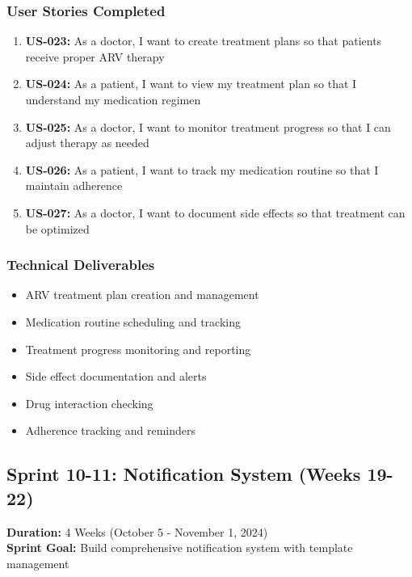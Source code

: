 \documentclass[12pt,a4paper]{article}
\begin{document}
\subsubsection{User Stories Completed}
\begin{enumerate}
    \item \textbf{US-023:} As a doctor, I want to create treatment plans so that patients receive proper ARV therapy
    \item \textbf{US-024:} As a patient, I want to view my treatment plan so that I understand my medication regimen
    \item \textbf{US-025:} As a doctor, I want to monitor treatment progress so that I can adjust therapy as needed
    \item \textbf{US-026:} As a patient, I want to track my medication routine so that I maintain adherence
    \item \textbf{US-027:} As a doctor, I want to document side effects so that treatment can be optimized
\end{enumerate}

\subsubsection{Technical Deliverables}
\begin{itemize}
    \item ARV treatment plan creation and management
    \item Medication routine scheduling and tracking
    \item Treatment progress monitoring and reporting
    \item Side effect documentation and alerts
    \item Drug interaction checking
    \item Adherence tracking and reminders
\end{itemize}

\subsection{Sprint 10-11: Notification System (Weeks 19-22)}
\textbf{Duration:} 4 Weeks (October 5 - November 1, 2024) \\
\textbf{Sprint Goal:} Build comprehensive notification system with template management
\end{document}
